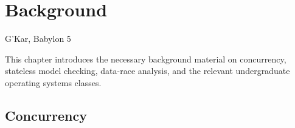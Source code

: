 \chapter{Background}
\label{chap:background}




{G'Kar, Babylon 5}

This chapter introduces the necessary background material on concurrency, stateless model checking, data-race analysis, and the relevant undergraduate operating systems classes.

\section{Concurrency}


